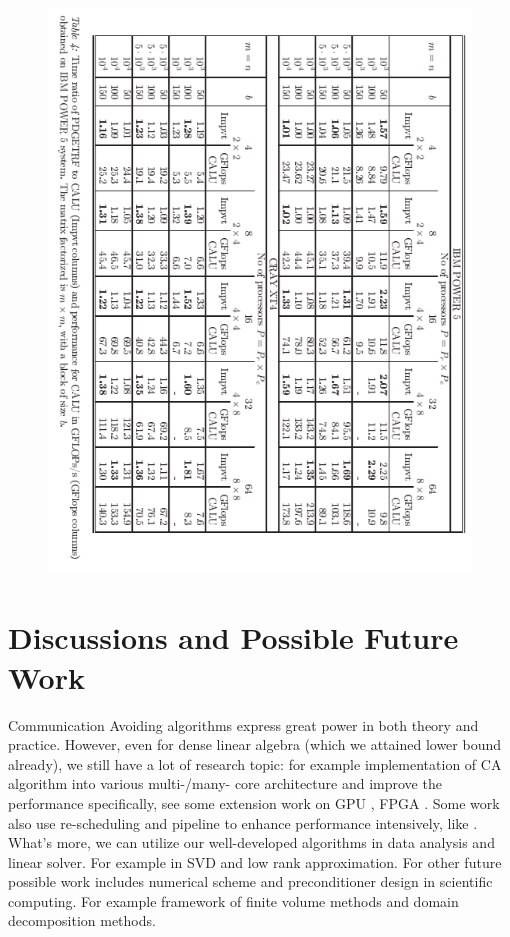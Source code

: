 \documentclass{article}
\begin{document}
\begin{figure}[htbp]
	\centering
	\includegraphics[scale=.6]{CALU_res.png}
\end{figure}


 \section{Discussions and Possible Future Work}
 Communication Avoiding algorithms express great power in both theory and practice. However, even for dense linear algebra (which we attained lower bound already), we still have a lot of research topic: for example implementation of CA algorithm into various multi-/many- core architecture and improve the performance specifically, see some extension work on GPU  \cite{anderson_communication-avoiding_2011,mehridehnavi_communication-avoiding_2013}, FPGA \cite{10.1145/3373087.3375296, 6339142}. Some work also use re-scheduling and pipeline to enhance performance intensively, like \cite{6468500}. What's more, we can utilize our well-developed algorithms in data analysis and linear solver. For example in SVD and low rank approximation. For other future possible work includes numerical scheme and preconditioner design in scientific computing. For example framework of finite volume methods and domain decomposition methods. 
 
 
\end{document}
